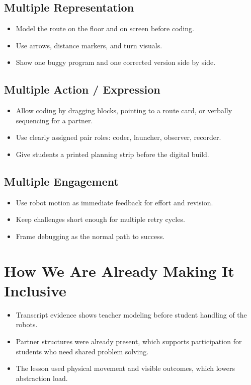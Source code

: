 \documentclass[11pt]{article}
\begin{document}
\subsection*{Multiple Representation}
\begin{itemize}[leftmargin=*]
\item Model the route on the floor and on screen before coding.
\item Use arrows, distance markers, and turn visuals.
\item Show one buggy program and one corrected version side by side.
\end{itemize}

\subsection*{Multiple Action / Expression}
\begin{itemize}[leftmargin=*]
\item Allow coding by dragging blocks, pointing to a route card, or verbally sequencing for a partner.
\item Use clearly assigned pair roles: coder, launcher, observer, recorder.
\item Give students a printed planning strip before the digital build.
\end{itemize}

\subsection*{Multiple Engagement}
\begin{itemize}[leftmargin=*]
\item Use robot motion as immediate feedback for effort and revision.
\item Keep challenges short enough for multiple retry cycles.
\item Frame debugging as the normal path to success.
\end{itemize}

\section*{How We Are Already Making It Inclusive}
\begin{itemize}[leftmargin=*]
\item Transcript evidence shows teacher modeling before student handling of the robots.
\item Partner structures were already present, which supports participation for students who need shared problem solving.
\item The lesson used physical movement and visible outcomes, which lowers abstraction load.
\end{itemize}
\end{document}
